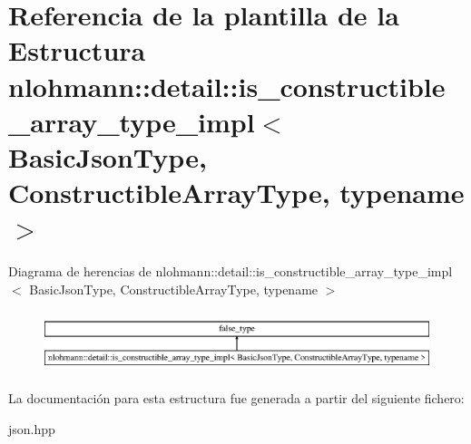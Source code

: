 \hypertarget{structnlohmann_1_1detail_1_1is__constructible__array__type__impl}{}\section{Referencia de la plantilla de la Estructura nlohmann\+:\+:detail\+:\+:is\+\_\+constructible\+\_\+array\+\_\+type\+\_\+impl$<$ Basic\+Json\+Type, Constructible\+Array\+Type, typename $>$}
\label{structnlohmann_1_1detail_1_1is__constructible__array__type__impl}
Diagrama de herencias de nlohmann\+:\+:detail\+:\+:is\+\_\+constructible\+\_\+array\+\_\+type\+\_\+impl$<$ Basic\+Json\+Type, Constructible\+Array\+Type, typename $>$\begin{figure}[H]
\begin{center}
\leavevmode
\includegraphics[height=1.809370cm]{structnlohmann_1_1detail_1_1is__constructible__array__type__impl}
\end{center}
\end{figure}


La documentación para esta estructura fue generada a partir del siguiente fichero\+:\begin{DoxyCompactItemize}
\item 
json.\+hpp\end{DoxyCompactItemize}
